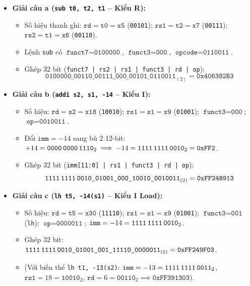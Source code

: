 \begin{itemize}
    \item \textbf{Giải câu a (\texttt{sub t0, t2, t1} -- Kiểu R):}
    \begin{itemize}
        \item Số hiệu thanh ghi: $\texttt{rd} = \texttt{t0} = \texttt{x5}$ (\texttt{00101}); $\texttt{rs1} = \texttt{t2} = \texttt{x7}$ (\texttt{00111}); $\texttt{rs2} = \texttt{t1} = \texttt{x6}$ (\texttt{00110}).
        \item Lệnh \texttt{sub} có $\texttt{funct7} = \texttt{0100000}$, $\texttt{funct3} = \texttt{000}$, $\texttt{opcode} = \texttt{0110011}$.
        \item Ghép 32 bit (\texttt{funct7 | rs2 | rs1 | funct3 | rd | op}):
        $$\texttt{0100000\_00110\_00111\_000\_00101\_0110011}_{(2)} = \mathbf{\texttt{0x406382B3}}$$
    \end{itemize}
    \item \textbf{Giải câu b (\texttt{addi s2, s1, -14} -- Kiểu I):}
    \begin{itemize}
        \item Số hiệu: $\texttt{rd} = \texttt{s2} = \texttt{x18}$ (\texttt{10010}); $\texttt{rs1} = \texttt{s1} = \texttt{x9}$ (\texttt{01001}); $\texttt{funct3} = \texttt{000}$; $\texttt{op} = \texttt{0010011}$.
        \item Đổi $\texttt{imm} = -14$ sang bù 2 12-bit: $+14 = \texttt{0000\,0000\,1110}_2 \implies -14 = \texttt{1111\,1111\,0010}_2 = \texttt{0xFF2}$.
        \item Ghép 32 bit (\texttt{imm[11:0] | rs1 | funct3 | rd | op}):
        $$\texttt{1111\,1111\,0010\_01001\_000\_10010\_0010011}_{(2)} = \mathbf{\texttt{0xFF248913}}$$
    \end{itemize}
    \item \textbf{Giải câu c (\texttt{lh t5, -14(s1)} -- Kiểu I Load):}
    \begin{itemize}
        \item Số hiệu: $\texttt{rd} = \texttt{t5} = \texttt{x30}$ (\texttt{11110}); $\texttt{rs1} = \texttt{s1} = \texttt{x9}$ (\texttt{01001}); $\texttt{funct3} = \texttt{001}$ (\texttt{lh}); $\texttt{op} = \texttt{0000011}$; $\texttt{imm} = -14 = \texttt{1111\,1111\,0010}_2$.
        \item Ghép 32 bit: $\texttt{1111\,1111\,0010\_01001\_001\_11110\_0000011}_{(2)} = \mathbf{\texttt{0xFF249F03}}$.
        \item (Với biến thể \texttt{lh t1, -13(s2)}: $\texttt{imm} = -13 = \texttt{1111\,1111\,0011}_2$, $\texttt{rs1} = 18 = \texttt{10010}_2$, $\texttt{rd} = 6 = \texttt{00110}_2 \implies \mathbf{\texttt{0xFF391303}}$).

\end{itemize}
\end{itemize}
